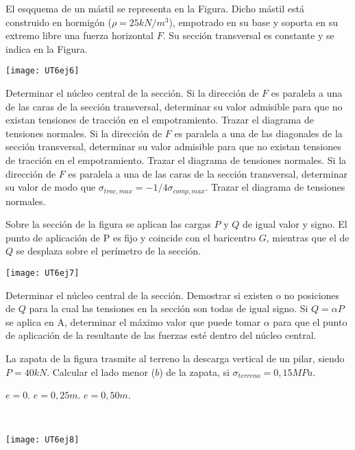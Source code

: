 El esqquema de un mástil se representa en la Figura. Dicho mástil está construido en hormigón ($\rho=25 kN/m^3$), empotrado en su base y soporta en su extremo libre una fuerza horizontal $F$. Su sección transversal es constante y se indica en la Figura.

\begin{center}
\texttt{[image: UT6ej6]}
\end{center}

\parte Determinar el núcleo central de la sección.
\parte Si la dirección de $F$ es paralela a una de las caras de la sección transversal, determinar su valor admisible para que no existan tensiones de tracción en el empotramiento. Trazar el diagrama de tensiones normales.
\parte Si la dirección de $F$ es paralela a una de las diagonales de la sección transversal, determinar su valor admisible para que no existan tensiones de tracción en el empotramiento. Trazar el diagrama de tensiones normales.
\parte Si la dirección de $F$ es paralela a una de las caras de la sección transversal, determinar su valor de modo que $\sigma_{trac,max}=-1/4\sigma_{comp,max}$. Trazar el diagrama de tensiones normales.

\ejercicio 

Sobre la sección de la figura se aplican las cargas $P$ y $Q$ de igual valor y signo. El punto de aplicación de P es fijo y coincide con el baricentro $G$, mientras que el de $Q$ se desplaza sobre el perímetro de la sección.

\begin{center}
\texttt{[image: UT6ej7]}
\end{center}

\parte Determinar el núcleo central de la sección.
\parte Demostrar si existen o no posiciones de $Q$ para la cual las tensiones en la sección son todas de igual signo.
\parte Si $Q = \alpha P$ se aplica en A, determinar el máximo valor que puede tomar $\alpha$ para que el punto de aplicación de la resultante de las fuerzas esté dentro del núcleo central.

\ejercicio 

\begin{minipage}[b]{0.5\textwidth}
La zapata de la figura trasmite al terreno la descarga vertical de un pilar, siendo $P=40kN$. %
%
Calcular el lado menor ($b$) de la zapata, si $\sigma_{terreno}=0,15MPa$.

\parte $e=0$.
\parte $e=0,25m$.
\parte $e=0,50m$.
\end{minipage}
~
\begin{minipage}[b]{0.5\textwidth}
 \begin{center}
  \texttt{[image: UT6ej8]}
 \end{center}
\end{minipage}


